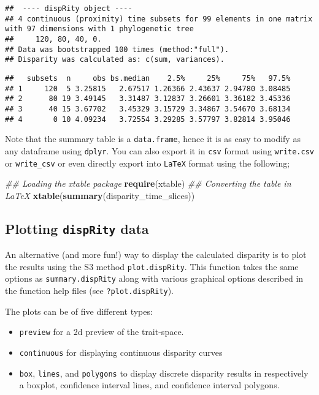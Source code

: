 \documentclass[
]{book}
\newenvironment{Shaded}{\begin{snugshade}}{\end{snugshade}}
\newcommand{\CommentTok}[1]{\textcolor[rgb]{0.56,0.35,0.01}{\textit{#1}}}
\newcommand{\KeywordTok}[1]{\textcolor[rgb]{0.13,0.29,0.53}{\textbf{#1}}}
\newcommand{\NormalTok}[1]{#1}
\providecommand{\tightlist}{%
  \setlength{\itemsep}{0pt}\setlength{\parskip}{0pt}}
\begin{document}
\begin{verbatim}
##  ---- dispRity object ---- 
## 4 continuous (proximity) time subsets for 99 elements in one matrix with 97 dimensions with 1 phylogenetic tree
##     120, 80, 40, 0.
## Data was bootstrapped 100 times (method:"full").
## Disparity was calculated as: c(sum, variances).
\end{verbatim}

\begin{verbatim}
##   subsets  n     obs bs.median    2.5%     25%     75%   97.5%
## 1     120  5 3.25815   2.67517 1.26366 2.43637 2.94780 3.08485
## 2      80 19 3.49145   3.31487 3.12837 3.26601 3.36182 3.45336
## 3      40 15 3.67702   3.45329 3.15729 3.34867 3.54670 3.68134
## 4       0 10 4.09234   3.72554 3.29285 3.57797 3.82814 3.95046
\end{verbatim}

Note that the summary table is a \texttt{data.frame}, hence it is as easy to modify as any dataframe using \texttt{dplyr}.
You can also export it in \texttt{csv} format using \texttt{write.csv} or \texttt{write\_csv} or even directly export into \texttt{LaTeX} format using the following;

\begin{Shaded}
\begin{Highlighting}[]
\CommentTok{\#\# Loading the xtable package}
\KeywordTok{require}\NormalTok{(xtable)}
\CommentTok{\#\# Converting the table in LaTeX}
\KeywordTok{xtable}\NormalTok{(}\KeywordTok{summary}\NormalTok{(disparity\_time\_slices))}
\end{Highlighting}
\end{Shaded}

\hypertarget{plotting-disprity-data}{%
\subsection{\texorpdfstring{Plotting \texttt{dispRity} data}{Plotting dispRity data}}\label{plotting-disprity-data}}

An alternative (and more fun!) way to display the calculated disparity is to plot the results using the S3 method \texttt{plot.dispRity}.
This function takes the same options as \texttt{summary.dispRity} along with various graphical options described in the function help files (see \texttt{?plot.dispRity}).

The plots can be of five different types:

\begin{itemize}
\tightlist
\item
  \texttt{preview} for a 2d preview of the trait-space.
\item
  \texttt{continuous} for displaying continuous disparity curves
\item
  \texttt{box}, \texttt{lines}, and \texttt{polygons} to display discrete disparity results in respectively a boxplot, confidence interval lines, and confidence interval polygons.
\end{itemize}
\end{document}
